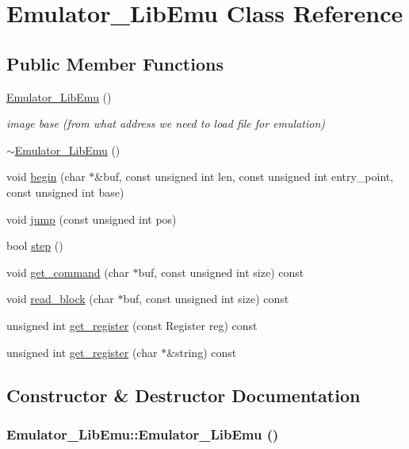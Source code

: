 \hypertarget{classEmulator__LibEmu}{
\section{Emulator\_\-LibEmu Class Reference}
\label{classEmulator__LibEmu}
}
\subsection*{Public Member Functions}
\begin{DoxyCompactItemize}
\item 
\hyperlink{classEmulator__LibEmu_ae8595b6312f2125ed061293d689ff23c}{Emulator\_\-LibEmu} ()
\begin{DoxyCompactList}\small\item\em image base (from what address we need to load file for emulation) \item\end{DoxyCompactList}\item 
\hyperlink{classEmulator__LibEmu_a358ea52a971cbb5e14b6e08bcbaa29fb}{$\sim$Emulator\_\-LibEmu} ()
\item 
void \hyperlink{classEmulator__LibEmu_af64acac5abd8f8c2e48ea8ac8e6a3a28}{begin} (char $\ast$\&buf, const unsigned int len, const unsigned int entry\_\-point, const unsigned int base)
\item 
void \hyperlink{classEmulator__LibEmu_a998a8239af4107121592764094de152c}{jump} (const unsigned int pos)
\item 
bool \hyperlink{classEmulator__LibEmu_a2d1424d0a52e51b37788e6186cc1ba9f}{step} ()
\item 
void \hyperlink{classEmulator__LibEmu_a8779c16bb5b588252c0d2d048c7954c5}{get\_\-command} (char $\ast$buf, const unsigned int size) const 
\item 
void \hyperlink{classEmulator__LibEmu_ab0b54d3e5a0b42ab48da798dc49b3306}{read\_\-block} (char $\ast$buf, const unsigned int size) const 
\item 
unsigned int \hyperlink{classEmulator__LibEmu_a574c79f85662bee6c54bf32f0203baf5}{get\_\-register} (const Register reg) const 
\item 
unsigned int \hyperlink{classEmulator__LibEmu_ad6f5f9fcfa552bf5865b6c9a432aa2ba}{get\_\-register} (char $\ast$\&string) const 
\end{DoxyCompactItemize}


\subsection{Constructor \& Destructor Documentation}
\hypertarget{classEmulator__LibEmu_ae8595b6312f2125ed061293d689ff23c}{
\subsubsection[{Emulator\_\-LibEmu}]{\setlength{\rightskip}{0pt plus 5cm}Emulator\_\-LibEmu::Emulator\_\-LibEmu ()}}
\label{classEmulator__LibEmu_ae8595b6312f2125ed061293d689ff23c}


